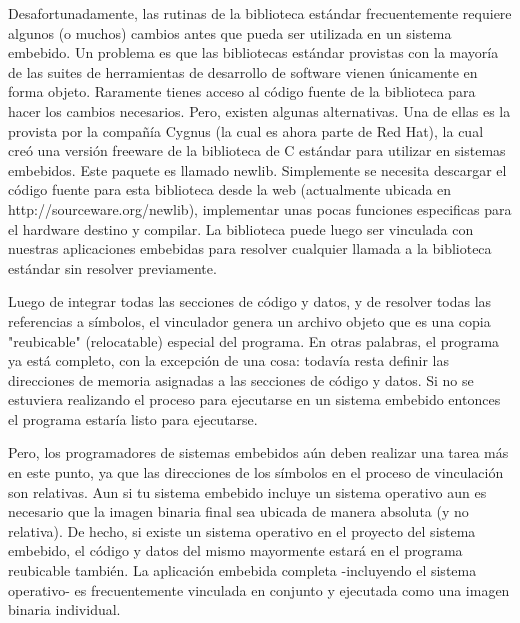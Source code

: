 \documentclass[12pt]{article}
\begin{document}


Desafortunadamente, las rutinas de la biblioteca estándar frecuentemente requiere 
algunos (o muchos) cambios antes que pueda ser utilizada en un sistema embebido.
Un problema es que las bibliotecas estándar provistas con la mayoría de las 
suites de herramientas de desarrollo de software vienen únicamente en forma objeto.
Raramente tienes acceso al código fuente de la biblioteca para hacer los 
cambios necesarios. Pero, existen algunas alternativas. Una de ellas es
la provista por la compañía Cygnus (la cual es ahora parte de Red Hat),
la cual creó una versión freeware de la biblioteca de C estándar para utilizar 
en sistemas embebidos.
Este paquete es llamado newlib. Simplemente se necesita descargar el código fuente
para esta biblioteca desde la web (actualmente ubicada en http://sourceware.org/newlib),
implementar unas pocas funciones especificas para el hardware destino y compilar.
La biblioteca puede luego ser vinculada con nuestras aplicaciones embebidas
para resolver cualquier llamada a la biblioteca estándar sin resolver previamente.

Luego de integrar todas las secciones de código y datos, y de resolver todas
las referencias a símbolos, el vinculador genera un archivo objeto que es
una copia "reubicable" (relocatable) especial del programa. En otras palabras,
el programa ya está completo, con la excepción de una cosa: todavía
resta definir las direcciones de memoria asignadas a las secciones de código y 
datos. Si no se estuviera realizando el proceso para ejecutarse en un 
sistema embebido entonces el programa estaría listo para ejecutarse.

Pero, los programadores de sistemas embebidos aún deben realizar una
tarea más en este punto, ya que 
las direcciones de los símbolos en el proceso de vinculación son relativas.
Aun si tu sistema embebido incluye un sistema operativo aun es necesario
que la imagen binaria final sea ubicada de manera absoluta (y no relativa).
De hecho, si existe un sistema operativo en el proyecto del sistema embebido,
el código y datos del mismo mayormente estará en el programa reubicable 
también.
La aplicación embebida completa -incluyendo el sistema operativo- es
frecuentemente vinculada en conjunto y ejecutada como una imagen binaria
individual.
\end{document}
